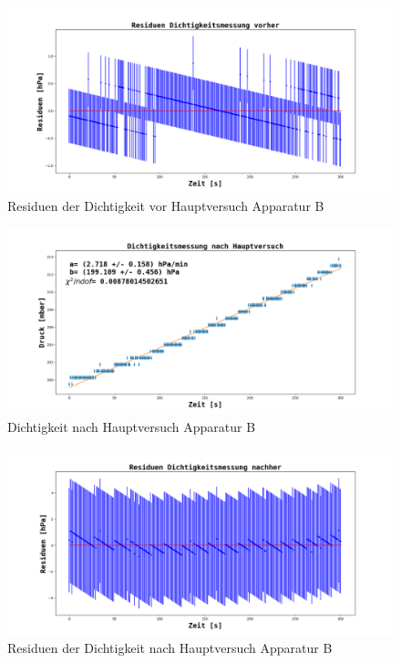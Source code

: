 \documentclass[12pt,a4paper]{article}
\begin{document}
\begin{figure}
\includegraphics[width=\linewidth]{Bilder/Residuen_Dichtigkeit_vorher_B.png}
\caption[Dichtigkeit vor Hauptversuch Apparatur B]{Residuen der Dichtigkeit vor Hauptversuch Apparatur B}
\label{fig:ResiduenDichtigkeitB}
\end{figure}

\begin{figure}
\includegraphics[width=\linewidth]{Bilder/Dichtigkeit_nachher_B.png}
\caption[Dichtigkeit vor Hauptversuch Apparatur B]{Dichtigkeit nach Hauptversuch Apparatur B}
\label{fig:DichtigkeitNachherB}
\end{figure}

\begin{figure}
\includegraphics[width=\linewidth]{Bilder/Residuen_Dichtigkeit_nachher_B.png}
\caption[Dichtigkeit nach Hauptversuch Apparatur B]{Residuen der Dichtigkeit nach Hauptversuch Apparatur B}
\label{fig:ResiduenDichtigkeitNachherB}
\end{figure}
\end{document}
